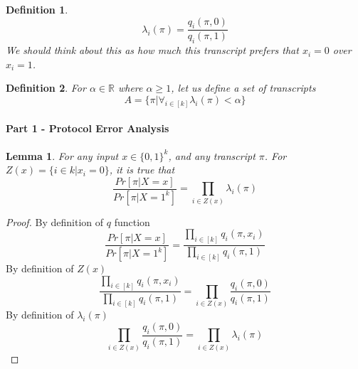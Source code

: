 \documentclass{article}
\theoremstyle{plain}
\newtheorem{lemma}[theorem]{Lemma}
\newtheorem{definition}{Definition}
\begin{document}
\begin{definition}
\begin{equation*}
    \lambda _i (\pi) = \frac{q_i(\pi, 0)}{q_i(\pi, 1)}
\end{equation*}
We should think about this as how much this transcript prefers that $x_i = 0$ over $x_i = 1$.
\end{definition}

\begin{definition}
For $\alpha \in \mathbb{R}$ where $\alpha \geq 1$, let us define a set of transcripts 
\begin{equation*}
    A = \{\pi | \forall_{i \in [k]} \lambda_i (\pi) < \alpha \}
\end{equation*}
\end{definition}


\paragraph{Part 1 - Protocol Error Analysis}
\begin{lemma}
For any input $x \in \{0,1\}^k$, and any transcript $\pi$. For $Z(x) = \{i \in k | x_i = 0\}$, it is true that  \newline
\begin{equation*}
    \frac{Pr[\pi | X = x]}{Pr[\pi | X = 1^k]} = \prod_{i \in Z(x)} \lambda_i(\pi)
\end{equation*}
\end{lemma}
\begin{proof}
By definition of $q$ function
\begin{equation*}
    \frac{Pr[\pi | X = x]}{Pr[\pi | X = 1^k]} = \frac{\prod_{i \in [k]} q_i (\pi, x_i)}{\prod_{i \in [k]} q_i (\pi, 1)}
\end{equation*}
By definition of $Z(x)$
\begin{equation*}
    \frac{\prod_{i \in [k]} q_i (\pi, x_i)}{\prod_{i \in [k]} q_i (\pi, 1)} = \prod_{i \in Z(x)} \frac{q_i (\pi, 0)}{q_i (\pi, 1)}
\end{equation*}
By definition of $\lambda_i (\pi)$
\begin{equation*}
    \prod_{i \in Z(x)} \frac{q_i (\pi, 0)}{q_i (\pi, 1)} = \prod_{i \in Z(x)} \lambda_i (\pi)
\end{equation*}
\end{proof}
\end{document}
